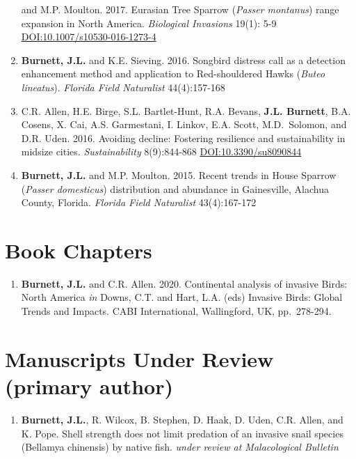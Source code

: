 \documentclass[11pt,]{article}
\providecommand{\tightlist}{%
  \setlength{\itemsep}{0pt}\setlength{\parskip}{0pt}}
\begin{document}
\begin{enumerate}
  and M.P. Moulton. 2017. Eurasian Tree Sparrow (\emph{Passer montanus})
  range expansion in North America. \emph{Biological Invasions} 19(1):
  5-9 \url{DOI:10.1007/s10530-016-1273-4}
\item
  \textbf{Burnett, J.L.} and K.E. Sieving. 2016. Songbird distress call
  as a detection enhancement method and application to Red-shouldered
  Hawks (\emph{Buteo lineatus}). \emph{Florida Field Naturalist}
  44(4):157-168
\item
  C.R. Allen, H.E. Birge, S.L. Bartlet-Hunt, R.A. Bevans, \textbf{J.L.
  Burnett}, B.A. Cosens, X. Cai, A.S. Garmestani, I. Linkov, E.A. Scott,
  M.D.~Solomon, and D.R. Uden. 2016. Avoiding decline: Fostering
  resilience and sustainability in midsize cities. \emph{Sustainability}
  8(9):844-868 \url{DOI:10.3390/su8090844}
\item
  \textbf{Burnett, J.L.} and M.P. Moulton. 2015. Recent trends in House
  Sparrow (\emph{Passer domesticus}) distribution and abundance in
  Gainesville, Alachua County, Florida. \emph{Florida Field Naturalist}
  43(4):167-172
\end{enumerate}

\hypertarget{book-chapters}{%
\section{Book Chapters}\label{book-chapters}}

\begin{enumerate}
\def\labelenumi{\arabic{enumi}.}
\tightlist
\item
  \textbf{Burnett, J.L.} and C.R. Allen. 2020. Continental analysis of
  invasive Birds: North America \emph{in} Downs, C.T. and Hart, L.A.
  (eds) Invasive Birds: Global Trends and Impacts. CABI International,
  Wallingford, UK, pp.~278-294.
\end{enumerate}

\hypertarget{manuscripts-under-review-primary-author}{%
\section{Manuscripts Under Review (primary
author)}\label{manuscripts-under-review-primary-author}}

\begin{enumerate}
\def\labelenumi{\arabic{enumi}.}
\tightlist
\item
  \textbf{Burnett, J.L.}, R. Wilcox, B. Stephen, D. Haak, D. Uden, C.R.
  Allen, and K. Pope. Shell strength does not limit predation of an
  invasive snail species (Bellamya chinensis) by native fish.
  \emph{under review at Malacological Bulletin}
\end{enumerate}
\end{document}
